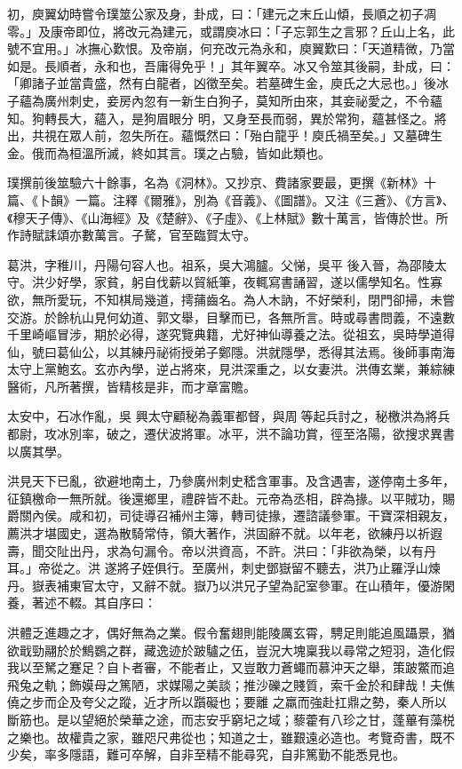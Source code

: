 \begin{pinyinscope}
 初，庾翼幼時嘗令璞筮公家及身，卦成，曰：「建元之末丘山傾，長順之初子凋零。」及康帝即位，將改元為建元，或謂庾冰曰：「子忘郭生之言邪？丘山上名，此號不宜用。」冰撫心歎恨。及帝崩，何充改元為永和，庾翼歎曰：「天道精微，乃當如是。長順者，永和也，吾庸得免乎！」其年翼卒。冰又令筮其後嗣，卦成，曰：「卿諸子並當貴盛，然有白龍者，凶徵至矣。若墓碑生金，庾氏之大忌也。」後冰子蘊為廣州刺史，妾房內忽有一新生白狗子，莫知所由來，其妾祕愛之，不令蘊知。狗轉長大，蘊入，是狗眉眼分
 明，又身至長而弱，異於常狗，蘊甚怪之。將出，共視在眾人前，忽失所在。蘊慨然曰：「殆白龍乎！庾氏禍至矣。」又墓碑生金。俄而為桓溫所滅，終如其言。璞之占驗，皆如此類也。



 璞撰前後筮驗六十餘事，名為《洞林》。又抄京、費諸家要最，更撰《新林》十篇、《卜韻》一篇。注釋《爾雅》，別為《音義》、《圖譜》。又注《三蒼》、《方言》、《穆天子傳》、《山海經》及《楚辭》、《子虛》、《上林賦》數十萬言，皆傳於世。所作詩賦誄頌亦數萬言。子驁，官至臨賀太守。



 葛洪，字稚川，丹陽句容人也。祖系，吳大鴻臚。父悌，吳平
 後入晉，為邵陵太守。洪少好學，家貧，躬自伐薪以貿紙筆，夜輒寫書誦習，遂以儒學知名。性寡欲，無所愛玩，不知棋局幾道，摴蒱齒名。為人木訥，不好榮利，閉門卻掃，未嘗交游。於餘杭山見何幼道、郭文舉，目擊而已，各無所言。時或尋書問義，不遠數千里崎嶇冒涉，期於必得，遂究覽典籍，尤好神仙導養之法。從祖玄，吳時學道得仙，號曰葛仙公，以其練丹祕術授弟子鄭隱。洪就隱學，悉得其法焉。後師事南海太守上黨鮑玄。玄亦內學，逆占將來，見洪深重之，以女妻洪。洪傳玄業，兼綜練醫術，凡所著撰，皆精核是非，而才章富贍。



 太安中，石冰作亂，吳
 興太守顧秘為義軍都督，與周等起兵討之，秘檄洪為將兵都尉，攻冰別率，破之，遷伏波將軍。冰平，洪不論功賞，徑至洛陽，欲搜求異書以廣其學。



 洪見天下已亂，欲避地南土，乃參廣州刺史嵇含軍事。及含遇害，遂停南土多年，征鎮檄命一無所就。後還鄉里，禮辟皆不赴。元帝為丞相，辟為掾。以平賊功，賜爵關內侯。咸和初，司徒導召補州主簿，轉司徒掾，遷諮議參軍。干寶深相親友，薦洪才堪國史，選為散騎常侍，領大著作，洪固辭不就。以年老，欲練丹以祈遐壽，聞交阯出丹，求為句漏令。帝以洪資高，不許。洪曰：「非欲為榮，以有丹耳。」帝從之。洪
 遂將子姪俱行。至廣州，刺史鄧嶽留不聽去，洪乃止羅浮山煉丹。嶽表補東官太守，又辭不就。嶽乃以洪兄子望為記室參軍。在山積年，優游閑養，著述不輟。其自序曰：



 洪體乏進趣之才，偶好無為之業。假令奮翅則能陵厲玄霄，騁足則能追風躡景，猶欲戢勁翮於於鷦鷃之群，藏逸迹於跛驢之伍，豈況大塊稟我以尋常之短羽，造化假我以至駑之蹇足？自卜者審，不能者止，又豈敢力蒼蠅而慕沖天之舉，策跛鱉而追飛兔之軌；飾嫫母之篤陋，求媒陽之美談；推沙礫之賤質，索千金於和肆哉！夫僬僥之步而企及夸父之蹤，近才所以躓礙也；要離
 之羸而強赴扛鼎之勢，秦人所以斷筋也。是以望絕於榮華之途，而志安乎窮圮之域；藜藿有八珍之甘，蓬蓽有藻棁之樂也。故權貴之家，雖咫尺弗從也；知道之士，雖艱遠必造也。考覽奇書，既不少矣，率多隱語，難可卒解，自非至精不能尋究，自非篤勤不能悉見也。




\end{pinyinscope}
